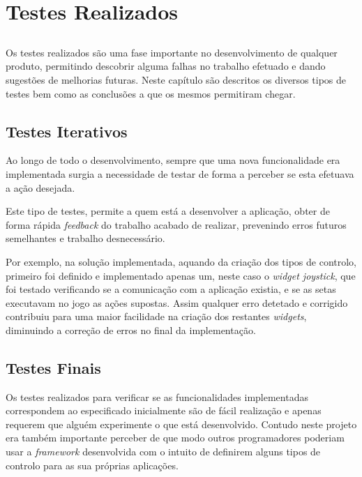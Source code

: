 \chapter{Testes Realizados} \label{chap:testes}

\section*{}

Os testes realizados são uma fase importante no desenvolvimento de qualquer produto, permitindo descobrir alguma falhas no trabalho efetuado e dando sugestões de melhorias futuras.
Neste capítulo são descritos os diversos tipos de testes bem como as conclusões a que os mesmos permitiram chegar.

\section{Testes Iterativos}

	Ao longo de todo o desenvolvimento, sempre que uma nova funcionalidade era implementada surgia a necessidade de testar de forma a perceber se esta efetuava a ação desejada.

	Este tipo de testes, permite a quem está a desenvolver a aplicação, obter de forma rápida \textit{feedback} do trabalho acabado de realizar, prevenindo erros futuros semelhantes e trabalho desnecessário.

	Por exemplo, na solução implementada, aquando da criação dos tipos de controlo, primeiro foi definido e implementado apenas um, neste caso o \textit{widget joystick}, que foi testado verificando se a comunicação com a aplicação existia, e se as setas executavam no jogo as ações supostas. Assim qualquer erro detetado e corrigido contribuiu para uma maior facilidade na criação dos restantes \textit{widgets}, diminuindo a correção de erros no final da implementação.


\section{Testes Finais}
	
	Os testes realizados para verificar se as funcionalidades implementadas correspondem ao especificado inicialmente são de fácil realização e apenas requerem que alguém experimente o que está desenvolvido. Contudo neste projeto era também importante perceber de que modo outros programadores poderiam usar a \textit{framework} desenvolvida com o intuito de definirem alguns tipos de controlo para as sua próprias aplicações.

